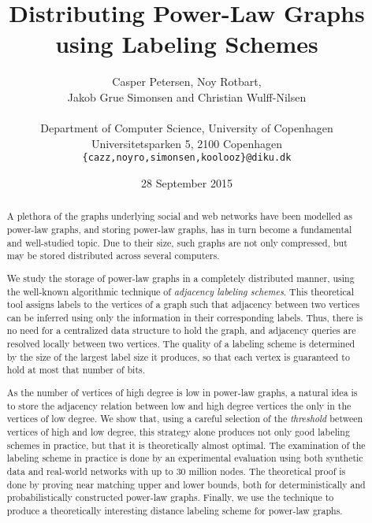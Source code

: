 \documentclass{acm_proc_article-sp}
\begin{document}
\title{Distributing Power-Law Graphs using Labeling Schemes}

\author{Casper Petersen, Noy Rotbart,\\ Jakob Grue Simonsen and Christian Wulff-Nilsen \\ \\
\small{Department of Computer Science, University of Copenhagen} \\
\small{Universitetsparken 5, 2100 Copenhagen}\\
 \small{\texttt{\{cazz,noyro,simonsen,koolooz\}@diku.dk}}  }
 

\date{28 September 2015}
\maketitle
\begin{abstract}
A plethora of the graphs underlying social and web networks  have been modelled as power-law graphs, and
storing  power-law graphs, has in turn become  a fundamental and  well-studied topic.
Due to their size, such graphs are not only compressed, but may be stored distributed across several computers.

We study the storage of  power-law graphs in a completely distributed manner, using the well-known algorithmic technique of \emph{adjacency labeling schemes}.
This theoretical tool assigns  labels to the vertices of a graph such that   adjacency between two vertices can be inferred using only the information in their corresponding labels. Thus, there is no need for a centralized data structure to hold the graph, and adjacency queries are resolved locally between two vertices. The quality of a labeling scheme is determined by the size of the largest label size it produces, so that each vertex is guaranteed to hold at most that number of bits.

As the number of vertices of high degree is low in power-law graphs, a natural idea is to store the adjacency relation between low and high degree vertices the only in the vertices of  low degree. 
We show that, using  a careful selection of the \emph{threshold} between vertices of high and low degree, this strategy alone produces not only good labeling schemes in practice, but that it is theoretically almost optimal. 
The examination of the labeling scheme in practice is done by an experimental evaluation using both synthetic data and real-world networks with up to 30 million nodes.
The theoretical proof is done by proving near matching upper and lower bounds, both for deterministically and probabilistically  constructed power-law graphs.
Finally, we use the  technique  to produce a  theoretically interesting distance labeling scheme for power-law graphs.
\end{abstract}
\end{document}
